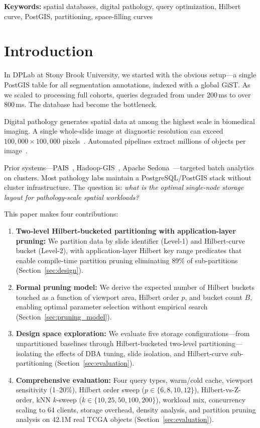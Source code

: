 \documentclass[10pt,twocolumn]{article}
\begin{document}
\noindent\textbf{Keywords:} spatial databases, digital pathology, query optimization, Hilbert curve, PostGIS, partitioning, space-filling curves

\section{Introduction}
\label{sec:intro}

In DPLab at Stony Brook University, we started with the obvious setup---a single PostGIS table for all segmentation annotations, indexed with a global GiST.
As we scaled to processing full cohorts, queries degraded from under 200\,ms to over 800\,ms.
The database had become the bottleneck.

Digital pathology generates spatial data at among the highest scale in biomedical imaging.
A single whole-slide image at diagnostic resolution can exceed $100{,}000 \times 100{,}000$ pixels~\cite{wang2014high,saltz2018spatial}.
Automated pipelines extract millions of objects per image~\cite{aji2013hadoop}.

Prior systems---PAIS~\cite{wang2011pais}, Hadoop-GIS~\cite{aji2013hadoop}, Apache Sedona~\cite{sedona2021}---targeted batch analytics on clusters.
Most pathology labs maintain a PostgreSQL/PostGIS stack without cluster infrastructure.
The question is: \emph{what is the optimal single-node storage layout for pathology-scale spatial workloads?}

This paper makes four contributions:

\begin{enumerate}
\item \textbf{Two-level Hilbert-bucketed partitioning with application-layer pruning:} We partition data by slide identifier (Level-1) and Hilbert-curve bucket (Level-2), with application-layer Hilbert key range predicates that enable compile-time partition pruning eliminating 89\% of sub-partitions (Section~\ref{sec:design}).

\item \textbf{Formal pruning model:} We derive the expected number of Hilbert buckets touched as a function of viewport area, Hilbert order $p$, and bucket count $B$, enabling optimal parameter selection without empirical search (Section~\ref{sec:pruning_model}).

\item \textbf{Design space exploration:} We evaluate five storage configurations---from unpartitioned baselines through Hilbert-bucketed two-level partitioning---isolating the effects of DBA tuning, slide isolation, and Hilbert-curve sub-partitioning (Section~\ref{sec:evaluation}).

\item \textbf{Comprehensive evaluation:} Four query types, warm/cold cache, viewport sensitivity (1--20\%), Hilbert order sweep ($p \in \{6,8,10,12\}$), Hilbert-vs-Z-order, kNN $k$-sweep ($k \in \{10,25,50,100,200\}$), workload mix, concurrency scaling to 64 clients, storage overhead, density analysis, and partition pruning analysis on 42.1M real TCGA objects (Section~\ref{sec:evaluation}).
\end{enumerate}
\end{document}
